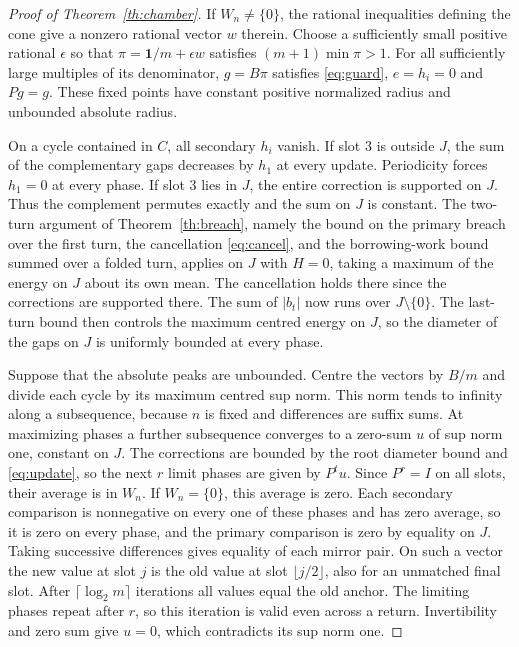 \documentclass[11pt,reqno]{amsart}
\theoremstyle{definition}
\begin{document}
\begin{proof}[Proof of Theorem~\ref{th:chamber}]
If \(W_n\ne\{0\}\), the rational inequalities defining the cone give a nonzero rational vector \(w\) therein. Choose a sufficiently small positive rational \(\epsilon\) so that \(\pi=\mathbf1/m+\epsilon w\) satisfies \((m+1)\min\pi>1\). For all sufficiently large multiples of its denominator, \(g=B\pi\) satisfies \eqref{eq:guard}, \(e=h_i=0\) and \(Pg=g\). These fixed points have constant positive normalized radius and unbounded absolute radius.

On a cycle contained in \(C\), all secondary \(h_i\) vanish. If slot 3 is outside \(J\), the sum of the complementary gaps decreases by \(h_1\) at every update. Periodicity forces \(h_1=0\) at every phase. If slot 3 lies in \(J\), the entire correction is supported on \(J\). Thus the complement permutes exactly and the sum on \(J\) is constant. The two-turn argument of Theorem~\ref{th:breach}, namely the bound on the primary breach over the first turn, the cancellation \eqref{eq:cancel}, and the borrowing-work bound summed over a folded turn, applies on \(J\) with \(H=0\), taking a maximum of the energy on \(J\) about its own mean. The cancellation holds there since the corrections are supported there. The sum of \(|b_t|\) now runs over \(J\setminus\{0\}\). The last-turn bound then controls the maximum centred energy on \(J\), so the diameter of the gaps on \(J\) is uniformly bounded at every phase.

Suppose that the absolute peaks are unbounded. Centre the vectors by \(B/m\) and divide each cycle by its maximum centred sup norm. This norm tends to infinity along a subsequence, because \(n\) is fixed and differences are suffix sums. At maximizing phases a further subsequence converges to a zero-sum \(u\) of sup norm one, constant on \(J\). The corrections are bounded by the root diameter bound and \eqref{eq:update}, so the next \(r\) limit phases are given by \(P^t u\). Since \(P^r=I\) on all slots, their average is in \(W_n\). If \(W_n=\{0\}\), this average is zero. Each secondary comparison is nonnegative on every one of these phases and has zero average, so it is zero on every phase, and the primary comparison is zero by equality on \(J\). Taking successive differences gives equality of each mirror pair. On such a vector the new value at slot \(j\) is the old value at slot \(\lfloor j/2\rfloor\), also for an unmatched final slot. After \(\lceil\log_2m\rceil\) iterations all values equal the old anchor. The limiting phases repeat after \(r\), so this iteration is valid even across a return. Invertibility and zero sum give \(u=0\), which contradicts its sup norm one.
\end{proof}
\end{document}

